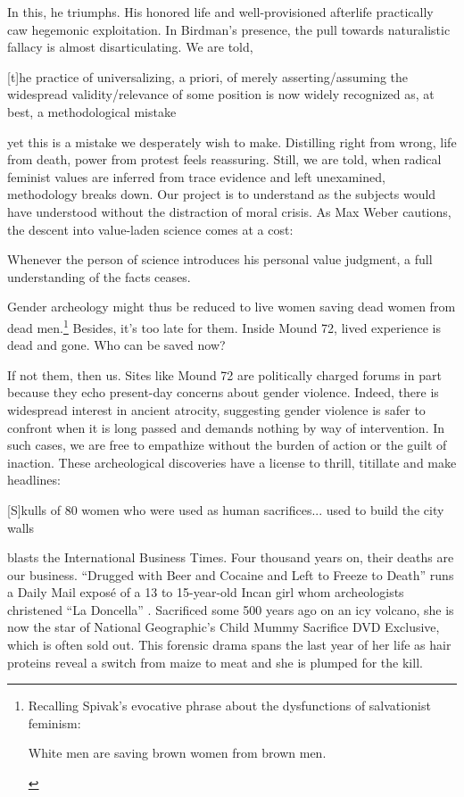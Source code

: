 In this, he triumphs. His honored life and well-provisioned afterlife practically caw hegemonic exploitation. In Birdman's presence, the pull towards naturalistic fallacy is almost disarticulating. We are told, \begin{IJSRAquote}{\cite[25]{lawson1999}}[t]he practice of universalizing, a priori, of merely asserting/assuming the widespread validity/relevance of some position is now widely recognized as, at best, a methodological mistake\end{IJSRAquote}yet this is a mistake we desperately wish to make. Distilling right from wrong, life from death, power from protest feels reassuring. Still, we are told, when radical feminist values are inferred from trace evidence and left unexamined, methodology breaks down. Our project is to understand as the subjects would have understood without the distraction of moral crisis. As Max Weber cautions, the descent into value-laden science comes at a cost: \begin{IJSRAquote}{\cite[146]{weber1946}}Whenever the person of science introduces his personal value judgment, a full understanding of the facts ceases.\end{IJSRAquote}Gender archeology might thus be reduced to live women saving dead women from dead men.\footnote{Recalling Spivak's evocative phrase about the dysfunctions of salvationist feminism: \begin{IJSRAquote}{\cite[48]{spivak2010}}White men are saving brown women from brown men.\end{IJSRAquote}} Besides, it's too late for them. Inside Mound 72, lived experience is dead and gone. Who can be saved now?

If not them, then us. Sites like Mound 72 are politically charged forums in part because they echo present-day concerns about gender violence. Indeed, there is widespread interest in ancient atrocity, suggesting gender violence is safer to confront when it is long passed and demands nothing by way of intervention. In such cases, we are free to empathize without the burden of action or the guilt of inaction. These archeological discoveries have a license to thrill, titillate and make headlines: \begin{IJSRAquote}{\cite[]{osborne2013}}[S]kulls of 80 women who were used as human sacrifices... used to build the city walls\end{IJSRAquote}blasts the International Business Times. Four thousand years on, their deaths are our business. \enquote{Drugged with Beer and Cocaine and Left to Freeze to Death} runs a Daily Mail exposé of a 13 to 15-year-old Incan girl whom archeologists christened \enquote{La Doncella} \parencite[]{macrae2013}. Sacrificed some 500 years ago on an icy volcano, she is now the star of National Geographic's Child Mummy Sacrifice DVD Exclusive, which is often sold out. This forensic drama spans the last year of her life as hair proteins reveal a switch from maize to meat and she is plumped for the kill. 

